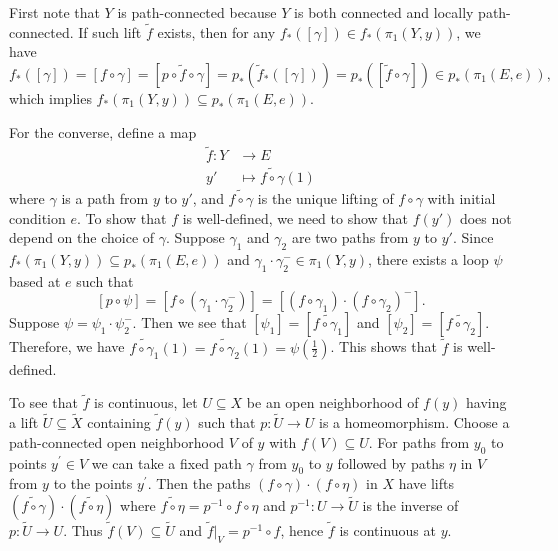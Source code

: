 \documentclass{report}
\begin{document}
\begin{prf}
	First note that $Y$ is path-connected because $Y$ is both connected and locally path-connected. If such lift $\widetilde{f}$ exists, then for any $f_*([\gamma])\in f_*\left(\pi_1\left(Y, y\right)\right)$, we have $$f_*([\gamma])=[f\circ\gamma]=[p\circ\widetilde{f}\circ\gamma]=p_*\left(\widetilde{f}_*([\gamma])\right)=p_*\left(\left[\widetilde{f}\circ\gamma\right]\right)\in p_*\left(\pi_1(E,e)\right),$$
	which implies $f_*\left(\pi_1\left(Y, y\right)\right) \subseteq p_*\left(\pi_1\left(E, e\right)\right)$.

	For the converse, define a map
	\begin{align*}
		\widetilde{f}:Y & \longrightarrow E                        \\
		y'              & \longmapsto \widetilde{f\circ \gamma}(1)
	\end{align*}
	where $\gamma$ is a path from $y$ to $y'$, and $\widetilde{f\circ \gamma}$ is the unique lifting of $f\circ \gamma$ with initial condition $e$. To show that $f$ is well-defined, we need to show that $f(y')$ does not depend on the choice of $\gamma$. Suppose $\gamma_1$ and $\gamma_2$ are two paths from $y$ to $y'$. Since $f_*\left(\pi_1\left(Y, y\right)\right) \subseteq p_*\left(\pi_1\left(E, e\right)\right)$ and $\gamma_1\cdot \gamma_2^{-}\in \pi_1\left(Y, y\right)$, there exists a loop $\psi$ based at $e$ such that
	\[
		[p\circ\psi]=\left[f\circ\left(\gamma_1\cdot \gamma_2^{-}\right)\right]=\left[\left(f\circ\gamma_1\right)\cdot\left(f\circ\gamma_2\right)^{-}\right].
	\]
	Suppose $\psi=\psi_1\cdot\psi_2^{-}$. Then we see that $\left[\psi_1\right]=\left[\widetilde{f\circ\gamma_1}\right]$ and $\left[\psi_2\right]=\left[\widetilde{f\circ\gamma_2}\right]$. Therefore, we have $\widetilde{f\circ\gamma_1}(1)=\widetilde{f\circ\gamma_2}(1)=\psi\left(\frac{1}{2}\right)$. This shows that $\widetilde{f}$ is well-defined.

	To see that $\tilde{f}$ is continuous, let $U \subseteq X$ be an open neighborhood of $f(y)$ having a lift $\tilde{U} \subseteq \tilde{X}$ containing $\tilde{f}(y)$ such that $p: \widetilde{U} \rightarrow U$ is a homeomorphism. Choose a path-connected open neighborhood $V$ of $y$ with $f(V) \subseteq U$. For paths from $y_0$ to points $y^{\prime} \in V$ we can take a fixed path $\gamma$ from $y_0$ to $y$ followed by paths $\eta$ in $V$ from $y$ to the points $y^{\prime}$. Then the paths $(f \circ\gamma) \cdot(f\circ \eta)$ in $X$ have lifts $(\widetilde{f \circ\gamma}) \cdot(\widetilde{f \circ\eta})$ where $\widetilde{f \circ\eta}=p^{-1} \circ f \circ\eta$ and $p^{-1}: U \rightarrow \widetilde{U}$ is the inverse of $p: \widetilde{U} \rightarrow U$. Thus $\tilde{f}(V) \subseteq \widetilde{U}$ and $\tilde{f}|_V=p^{-1} \circ f$, hence $\tilde{f}$ is continuous at $y$.
\end{prf}
\end{document}
